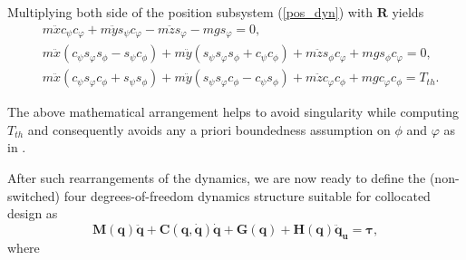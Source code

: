 \documentclass[AMA,STIX1COL,sort, compress]{WileyNJD-v2}
\begin{document}
Multiplying both side of the position subsystem (\ref{pos_dyn}) with $\mathbf{R}$ yields
\begin{subequations}\label{pos_dyn_mod}
	\begin{align}
	&	m\ddot{x}c_{\psi}c_{\varphi} + m\ddot{y}s_{\psi}c_{\varphi} - m\ddot{z}s_{\varphi} - mgs_{\varphi} = 0, \\
	&	m\ddot{x}(c_{\psi}s_{\varphi}s_{\phi} - s_{\psi}c_{\phi}) + m\ddot{y}(s_{\psi}s_{\varphi}s_{\phi} + c_{\psi}c_{\phi}) + m\ddot{z}s_{\phi}c_{\varphi} + mgs_{\phi}c_{\varphi} = 0 , \\
	&	m\ddot{x}(c_{\psi}s_{\varphi}c_{\phi} + s_{\psi}s_{\phi}) + m\ddot{y}(s_{\psi}s_{\varphi}c_{\phi} - c_{\psi}s_{\phi}) + m\ddot{z}c_{\varphi}c_{\phi} + mgc_{\varphi}c_{\phi} = T_{th}.
	\end{align}
\end{subequations}
\begin{remark}
	The above mathematical arrangement helps to avoid singularity while computing $T_{th}$ and consequently avoids any a priori boundedness assumption on $\phi$ and $\varphi$ as in \cite{bialy2013lyapunov}. 
\end{remark} 
After such rearrangements of the dynamics, we are now ready to define the (non-switched) four degrees-of-freedom dynamics structure suitable for collocated design as
\begin{equation}\label{sys_non_sw}
\mathbf M( \mathbf q)\ddot{ \mathbf q}+\mathbf C(\mathbf q,\dot{\mathbf q})\dot{\mathbf q}+\mathbf G(\mathbf q)+\mathbf{H}( \mathbf q)\ddot{ \mathbf{q}}_{\mathbf u}=\boldsymbol \tau,
\end{equation} 
where
\end{document}
